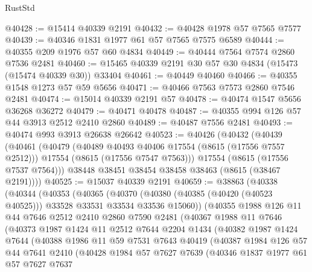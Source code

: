 \begin{lexlean}{RustStd}
\begin{coremodule}
@40428 := @15414 @40339 @2191
@40432 := @40428 @1978 @57 @7565 @7577
@40439 := @40346 @1831 @1977 @61 @57 @7565 @7575 @6589
@40444 := @40355 @209 @1976 @57 @60 @4834
@40449 := @40444 @7564 @7574 @2860 @7536 @2481
@40460 := @15465 @40339 @2191 @30 @57 @30 @4834 (@15473 (@15474 @40339 @30)) @33404
@40461 := @40449 @40460
@40466 := @40355 @1548 @1273 @57 @59 @5656
@40471 := @40466 @7563 @7573 @2860 @7546 @2481
@40474 := @15014 @40339 @2191 @57
@40478 := @40474 @1547 @5656 @36268 @36272
@40479 := @40471 @40478
@40487 := @40355 @994 @126 @57 @44 @3913 @2512 @2410 @2860
@40489 := @40487 @7556 @2481
@40493 := @40474 @993 @3913 @26638 @26642
@40523 := @40426
    (@40432
      (@40439
        (@40461
          (@40479
            (@40489 @40493 @40406 @17554 (@8615 (@17556 @7557 @2512)))
            @17554
            (@8615 (@17556 @7547 @7563)))
          @17554
          (@8615 (@17556 @7537 @7564)))
        @38448
        @38451
        @38454
        @38458
        @38463
        (@8615 (@38467 @2191))))
@40525 := @15037 @40339 @2191
@40659 := @38863
    (@40338
      (@40344
        (@40353
          (@40365
            (@40370 (@40380 (@40385 (@40420 (@40523 @40525))) @33528 @33531 @33534 @33536 @15060))
            (@40355
              @1988
              @126
              @11
              @44
              @7646
              @2512
              @2410
              @2860
              @7590
              @2481
              (@40367
                @1988
                @11
                @7646
                (@40373
                  @1987
                  @1424
                  @11
                  @2512
                  @7644
                  @2204
                  @1434
                  (@40382
                    @1987
                    @1424
                    @7644
                    (@40388
                      @1986
                      @11
                      @59
                      @7531
                      @7643
                      @40419
                      (@40387
                        @1984
                        @126
                        @57
                        @44
                        @7641
                        @2410
                        (@40428
                          @1984
                          @57
                          @7627
                          @7639
                          (@40346
                            @1837
                            @1977
                            @61
                            @57
                            @7627
                            @7637

\end{coremodule}
\end{lexlean}
